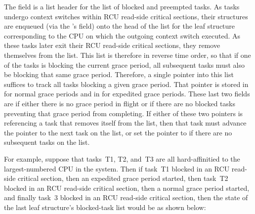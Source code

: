 The  field is a list header for the list of blocked and
preempted tasks.
As tasks undergo context switches within RCU read-side
critical sections, their  structures are enqueued (via
the 's  field) onto the head of the
 list for the leaf  structure corresponding
to the CPU on which the outgoing context switch executed.
As these tasks
later exit their RCU read-side critical sections, they remove themselves
from the list.
This list is therefore in reverse time order, so that if
one of the tasks is blocking the current grace period, all subsequent
tasks must also be blocking that same grace period.
Therefore, a single
pointer into this list suffices to track all tasks blocking a given
grace period.
That pointer is stored in  for normal grace
periods and in  for expedited grace periods.
These last
two fields are  if either there is no grace period in flight or
if there are no blocked tasks preventing that grace period from
completing.
If either of these two pointers is referencing a task that
removes itself from the  list, then that task must
advance the pointer to the next task on the list, or set the pointer to
 if there are no subsequent tasks on the list.

For example, suppose that tasks~T1, T2, and~T3 are all hard-affinitied
to the largest-numbered CPU in the system.
Then if task~T1 blocked in an
RCU read-side critical section, then an expedited grace period started,
then task~T2 blocked in an RCU read-side critical section, then a normal
grace period started, and finally task~3 blocked in an RCU read-side
critical section, then the state of the last leaf 
structure's blocked-task list would be as shown below:

\begin{center}
\end{center}

